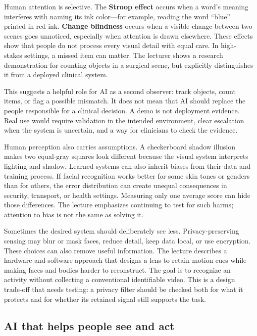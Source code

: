 Human attention is selective. The \textbf{Stroop effect} occurs when a word's meaning interferes with naming its ink color---for example, reading the word ``blue'' printed in red ink. \textbf{Change blindness} occurs when a visible change between two scenes goes unnoticed, especially when attention is drawn elsewhere. These effects show that people do not process every visual detail with equal care. In high-stakes settings, a missed item can matter. The lecturer shows a research demonstration for counting objects in a surgical scene, but explicitly distinguishes it from a deployed clinical system.

This suggests a helpful role for AI as a second observer: track objects, count items, or flag a possible mismatch. It does not mean that AI should replace the people responsible for a clinical decision. A demo is not deployment evidence. Real use would require validation in the intended environment, clear escalation when the system is uncertain, and a way for clinicians to check the evidence.

Human perception also carries assumptions. A checkerboard shadow illusion makes two equal-gray squares look different because the visual system interprets lighting and shadow. Learned systems can also inherit biases from their data and training process. If facial recognition works better for some skin tones or genders than for others, the error distribution can create unequal consequences in security, transport, or health settings. Measuring only one average score can hide those differences. The lecture emphasizes continuing to test for such harms; attention to bias is not the same as solving it.

Sometimes the desired system should deliberately see less. Privacy-preserving sensing may blur or mask faces, reduce detail, keep data local, or use encryption. These choices can also remove useful information. The lecture describes a hardware-and-software approach that designs a lens to retain motion cues while making faces and bodies harder to reconstruct. The goal is to recognize an activity without collecting a conventional identifiable video. This is a design trade-off that needs testing: a privacy filter should be checked both for what it protects and for whether its retained signal still supports the task.

\subsection{AI that helps people see and act}\label{04-visual-computing-ii-ch034-ai-that-helps-people-see-and-act}

